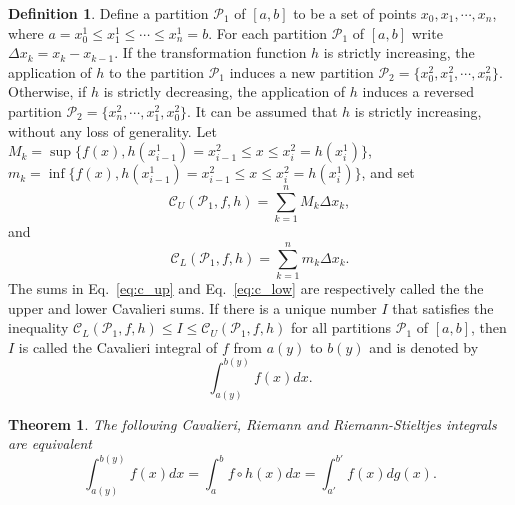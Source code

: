 \documentclass{article}
\theoremstyle{theorem}
\newtheorem{theorem}{Theorem}
\theoremstyle{definition}
\newtheorem*{definition}{Definition}
\begin{document}
\begin{definition}
Define a partition $\mathcal{P}_1$ of $[a,b]$ to be a set of points $x_0, x_1,\cdots,x_n$, 
where $a = x_0^1 \leq x_1^1 \leq \cdots \leq x_n^1 = b$. For each partition 
$\mathcal{P}_1$ of $[a,b]$ write $\Delta x_k = x_k-x_{k-1}$. 
If the transformation function $h$ is strictly increasing,
the application of $h$ to the partition $\mathcal{P}_1$ induces a new partition $\mathcal{P}_2 = \{x_0^2, x_1^2,\cdots, x_n^2\}$.
Otherwise, if $h$ is strictly decreasing, the application of $h$ induces a reversed partition $\mathcal{P}_2 = \{x_n^2, \cdots, x_1^2,x_0^2\}$. It
can be assumed that $h$ is strictly increasing, without any loss of generality.  Let 
$M_k = \sup \{f (x), h(x_{i-1}^1) = x_{i-1}^2 \leq x \leq x_i^2 = h(x_i^1)\}$, $m_k = \inf \{f (x), h(x_{i-1}^1) = x_{i-1}^2 \leq x \leq x_i^2 = h(x_i^1)\}$, and set 
\begin{equation}
\label{eq:c_up}
\mathcal{C}_U(\mathcal{P}_1,f,h) = \sum_{k=1}^n M_k \Delta x_k, 
\end{equation}
and
\begin{equation}
\label{eq:c_low}
\mathcal{C}_L(\mathcal{P}_1,f,h) = \sum_{k=1}^n m_k \Delta x_k. 
\end{equation}
The sums in Eq.~\eqref{eq:c_up} and Eq.~\eqref{eq:c_low} are respectively called the the upper and lower Cavalieri sums.
If there is a unique number $I$ that satisfies the inequality $\mathcal{C}_L(\mathcal{P}_1,f,h)\leq I \leq \mathcal{C}_U(\mathcal{P}_1,f,h)$ for all 
partitions $\mathcal{P}_1$ of $[a,b]$, then $I$ is called the Cavalieri integral of $f$ from $a(y)$ to $b(y)$ and is denoted by
\begin{equation}
\int_{a(y)}^{b(y)} f(x) dx.
\end{equation}
\end{definition}

\begin{theorem}
The following Cavalieri, Riemann and Riemann-Stieltjes integrals are equivalent
\begin{equation}
\int_{a(y)}^{b(y)} f(x) dx = \int_a^b f\circ h(x) dx = \int_{a'}^{b'} f(x)dg(x). 
\end{equation}
\end{theorem}
\end{document}
